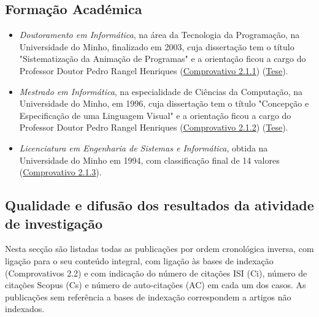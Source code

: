 \documentclass[11pt]{article}
\begin{document}
\subsection{Formação Académica} 
\begin{itemize} 
\item{ {\em{{Doutoramento em Informática}}}, na área da Tecnologia da Programação, na Universidade do Minho, finalizado em 2003, cuja dissertação tem o título "Sistematização da Animação de Programas" e a orientação ficou a cargo do Professor Doutor Pedro Rangel Henriques (\href{run:Diplomas/dout.pdf}{Comprovativo 2.1.1}) (\href{run:Publicacoes/publicacoes/8.pdf}{Tese}).}
\item{ {\em{{Mestrado em Informática}}}, na especialidade de Ciências da Computação, na Universidade do Minho, em 1996, cuja dissertação tem o título "Concepção e Especificação de uma Linguagem Visual" e a orientação ficou a cargo do Professor Doutor Pedro Rangel Henriques (\href{run:Diplomas/mest.pdf}{Comprovativo 2.1.2}) (\href{run:Publicacoes/publicacoes/1.pdf}{Tese}).}
\item{ {\em{{Licenciatura em Engenharia de Sistemas e Informática}}}, obtida na Universidade do Minho em 1994, com classificação final de 14 valores (\href{run:Diplomas/licenc.pdf}{Comprovativo 2.1.3}).}
\end{itemize}


\subsection{Qualidade e difusão dos resultados da atividade de investigação}

Nesta secção são listadas todas as publicações por ordem cronológica inversa, com ligação para o seu conteúdo integral, com ligação às bases de indexação (Comprovativos 2.2) e com indicação do número de citações ISI (Ci), número de citações Scopus (Cs) e número de auto-citações (AC) em cada um dos casos. As publicações sem referência a bases de indexação correspondem a artigos não indexados.
\end{document}
